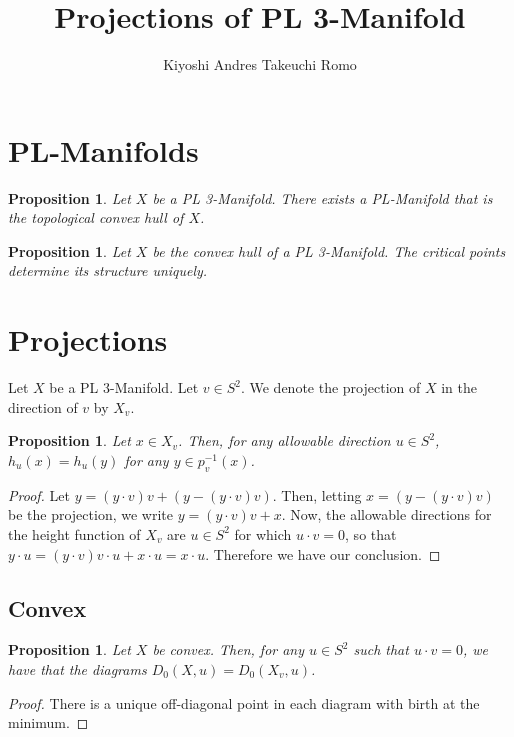 \documentclass[12pt]{article}
\title{Projections of PL 3-Manifold}
\author{Kiyoshi Andres Takeuchi Romo}
\theoremstyle{theorem}
\newtheorem{proposition}[theorem]{Proposition}
\theoremstyle{definition}
\theoremstyle{remark}
\theoremstyle{gremark}
\theoremstyle{discussion}
\theoremstyle{notation}
\begin{document}
	
	\maketitle
	
	\section*{PL-Manifolds}
	
	\begin{proposition}
		Let $X$ be a PL 3-Manifold. There exists a PL-Manifold that is the topological convex hull of $X$.
	\end{proposition}

	\begin{proposition}
		Let $X$ be the convex hull of a PL 3-Manifold. The critical points determine its structure uniquely.
	\end{proposition}


	\section*{Projections}
	
	Let $X$ be a PL 3-Manifold. Let $v\in S^2$. We denote the projection of $X$ in the direction of $v$ by $X_v$. 
	
	\begin{proposition}
		Let $x\in X_v$. Then, for any allowable direction $u\in S^2$, $h_u(x)=h_u(y)$ for any $y\in p_v^{-1}(x)$.
	\end{proposition}

	\begin{proof}
		Let $y=(y\cdot v)v+(y-(y\cdot v)v)$. Then, letting $x=(y-(y\cdot v)v)$ be the projection, we write $y=(y\cdot v)v+x$.
		Now, the allowable directions for the height function of $X_v$ are $u\in S^2$ for which $u\cdot v=0$, so that $y\cdot u=(y\cdot v)v\cdot u + x\cdot u=x\cdot u$. Therefore we have our conclusion.
	\end{proof}

	\subsection{Convex}
	
	\begin{proposition}
		Let $X$ be convex. Then, for any $u\in S^2$ such that $u\cdot v=0$, we have that the diagrams $D_0(X,u)=D_0(X_v,u)$.
	\end{proposition}

	\begin{proof}
		There is a unique off-diagonal point in each diagram with birth at the minimum.
	\end{proof}
\end{document}
